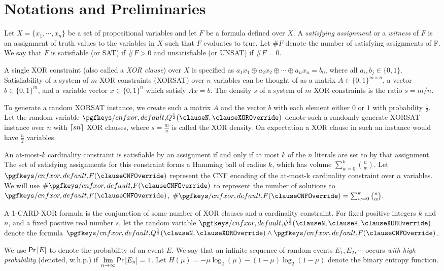 

\section{Notations and Preliminaries} \label{sec:prelims}

Let $X = \{x_1,\cdots,x_n\} $ be a set of propositional variables and let $F$ be a formula defined over $X$. A \textit{satisfying assignment} or a \textit{witness} of $F$ is an assignment of truth values to the variables in $X$ such that $F$ evaluates to true. Let $\#F$ denote the number of satisfying assignments of F. We say that $F$ is satisfiable (or SAT) if $\#F>0$ and unsatisfiable (or UNSAT) if $\#F=0$.
 
A single XOR constraint (also called a {\em XOR clause}) over $X$ is specified as $ a_{1}x_{1} \oplus a_{2}x_{2} \oplus \cdots \oplus a_{n}x_{n} = b_{0}$, where all $a_{i},b_{j} \in \{0,1\}$. 
Satisfiability of a system of $m$ XOR constraints (XORSAT) over $n$ variables can be thought of as a matrix $A \in \{0,1\}^{m \times n} $, a vector $b \in \{0,1\}^m$, and a variable vector $x \in \{0,1\}^n$ which satisfy $Ax=b$. The density $s$ of a system of $m$ XOR constraints is the ratio $s=m/n$. 


To generate a random XORSAT instance, we create such a matrix $A$ and the vector $b$ with each element either $0$ or $1$ with probability $\frac{1}{2}$.    
Let the random variable $\Q$ denote such a randomly generate XORSAT instance over $n$ with $\ceil{sn}$ XOR clauses, where $s=\frac{m}{n}$ is called the XOR density. On expectation
a XOR clause in such an instance would have $\frac{n}{2}$ variables.

An at-most-$k$ cardinality constraint is satisfiable by an assignment if and only if at most $k$ of the $n$ literals are set to \true by that assignment. The set of satisfying assignments for this constraint forms a Hamming ball of radius $k$, which has volume $\sum_{w=0}^{k} {{n} \choose {w}}$.
Let $\F$  represent the CNF encoding of the at-most-k cardinality constraint over $n$ variables. We will use $\#\F$ to represent the number of solutions to $\F$, $\#\F = \sum_{w=0}^{k} {{n} \choose {w}}$.  

A 1-CARD-XOR formula is the conjunction of some number of XOR clauses and a cardinality constraint. For fixed positive integers $k$ and $n$, and a fixed positive real number $s$, let the random variable $\FQ$ denote the formula $\Q \wedge \F$.

We use $\P{E}$ to denote the probability of an event $E$. 
We say that an infinite sequence of random events $E_1, E_2, \cdots $ occurs 
\emph{with high probability} (denoted, w.h.p.) if $\lim\limits_{n \to \infty} \P{E_n} = 1$.
Let $H(\mu)= - \mu\log_{2}(\mu)-(1-\mu)\log_{2}(1-\mu)$ denote the binary entropy function.
